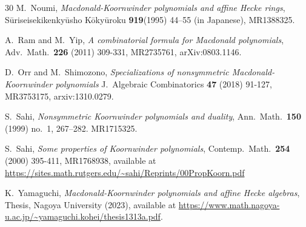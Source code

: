 \documentclass[11pt]{article}
\theoremstyle{plain}
\theoremstyle{definition}
\theoremstyle{remark}
\numberwithin{equation}{section}
\newcounter{r}
\newcounter{s}
\begin{document}
\begin{thebibliography}{30}
  M.\ Noumi, \emph{Macdonald-Koornwinder polynomials and affine Hecke rings},
 S\=uriseisekikenky\=usho K\=oky\=uroku \textbf{919}(1995) 44--55 (in Japanese),
 MR1388325.


  A.\ Ram and M.\ Yip, 
 \emph{A combinatorial formula for Macdonald polynomials}, 
 Adv.\ Math.\ \textbf{226} (2011) 309-331, MR2735761,
 arXiv:0803.1146.

 D.\  Orr and M.\ Shimozono,
\emph{Specializations of nonsymmetric Macdonald-Koornwinder polynomials} 
J.\ Algebraic Combinatorics \textbf{47} (2018) 91-127, MR3753175, arxiv:1310.0279.

  S.\ Sahi, \emph{Nonsymmetric Koornwinder polynomials and duality}, Ann.\ 
 Math.\ \textbf{150} (1999) no.\ 1, 267--282. MR1715325.

  S.\ Sahi, \emph{Some properties of Koornwinder polynomials},
 Contemp.\ Math.\ \textbf{254} (2000) 395-411, MR1768938, available at
\url{https://sites.math.rutgers.edu/~sahi/Reprints/00PropKoorn.pdf}
 
 K.\ Yamaguchi, \emph{Macdonald-Koornwinder polynomials and affine Hecke algebras},
Thesis, Nagoya University (2023), available at \url{https://www.math.nagoya-u.ac.jp/~yamaguchi.kohei/thesis1313a.pdf}.

 \end{thebibliography}
\end{document}
